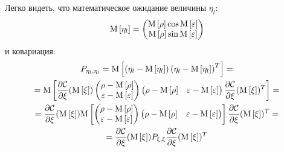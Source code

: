 Легко видеть, что математическое ожидание величины $\eta_l$:
$$
    \mathrm{M} \left [ \eta_l \right ]
        =
        \begin{pmatrix}
            \mathrm{M} \left [ \rho \right ] \cos \mathrm{M} \left [ \varepsilon \right ] \\
            \mathrm{M} \left [ \rho \right ] \sin \mathrm{M} \left [ \varepsilon \right ]
        \end{pmatrix}
$$
и ковариация:
\begin{multline*}
    P_{\eta_l, \eta_l}
    = \mathrm{M} \left [ \left ( \eta_l - \mathrm{M} \left [ \eta_l \right ] \right ) \left ( \eta_l - \mathrm{M} \left [ \eta_l \right ] \right )^T \right ] = \\
    = \mathrm{M} \left [ 
            \frac{\partial \mathcal{C}}{\partial \xi}(\mathrm{M} \left [ \xi \right ])
            \begin{pmatrix}
                \rho - \mathrm{M} \left [ \rho \right ] \\
                \varepsilon - \mathrm{M} \left [ \varepsilon \right ]
            \end{pmatrix}
            \begin{pmatrix}
                \rho - \mathrm{M} \left [ \rho \right ] & \varepsilon - \mathrm{M} \left [ \varepsilon \right ]
            \end{pmatrix}
            \frac{\partial \mathcal{C}}{\partial \xi}(\mathrm{M} \left [ \xi \right ])^T
         \right ]
        = \\
    =
        \frac{\partial \mathcal{C}}{\partial \xi}(\mathrm{M} \left [ \xi \right ])
        \mathrm{M} \left [ 
            \begin{pmatrix}
                \rho - \mathrm{M} \left [ \rho \right ] \\
                \varepsilon - \mathrm{M} \left [ \varepsilon \right ]
            \end{pmatrix}
            \begin{pmatrix}
                \rho - \mathrm{M} \left [ \rho \right ] & \varepsilon - \mathrm{M} \left [ \varepsilon \right ]
            \end{pmatrix}
         \right ]
        \frac{\partial \mathcal{C}}{\partial \xi}(\mathrm{M} \left [ \xi \right ])^T
        = \\
    =
        \frac{\partial \mathcal{C}}{\partial \xi}(\mathrm{M} \left [ \xi \right ]) P_{\xi, \xi} \frac{\partial \mathcal{C}}{\partial \xi}(\mathrm{M} \left [ \xi \right ])^T
\end{multline*}